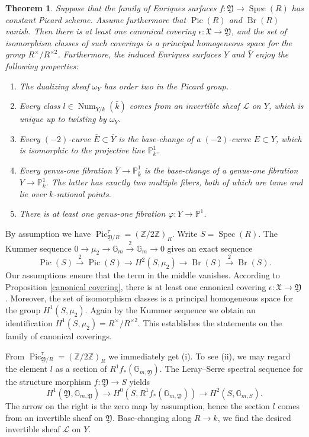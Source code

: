 \documentclass[oneside, 12pt]{amsart}
\newcommand\mylabel[1]{\label{#1}\marginpar{\vspace{-1ex}\medskip\medskip\footnotesize \tt #1}}
\renewcommand\mylabel[1]{\label{#1}}
\newtheorem{theorem}{Theorem}[section]
\theoremstyle{definition}
\theoremstyle{remark}
\newcommand{\ZZ}{\mathbb{Z}}
\newcommand{\PP}{\mathbb{P}}
\newcommand{\GG}{\mathbb{G}}
\newcommand{\shL}{\mathscr{L}}
\newcommand{\foX}{\mathfrak{X}}
\newcommand{\foY}{\mathfrak{Y}}
\newcommand{\Br}{\operatorname{Br}}
\newcommand{\lra}{\longrightarrow}
\newcommand{\Num}{\operatorname{Num}}
\newcommand{\Pic}{\operatorname{Pic}}
\newcommand{\ra}{\rightarrow}
\newcommand{\Spec}{\operatorname{Spec}}
\newcommand{\bk}{{\bar{k}}}
\newcommand{\bY}{{\bar{Y}}}
\newcommand{\bE}{{\bar{E}}}
\begin{document}
\begin{theorem}
\mylabel{family with constant pic}
Suppose that the family of Enriques surfaces  $f:\foY\ra\Spec(R)$ has constant Picard scheme.
Assume furthermore  that  $\Pic(R)$  and  $\Br(R)$ vanish.
Then there is at least one canonical covering $\epsilon:\foX\ra \foY$, and 
the set of isomorphism classes  of such coverings  
is a principal homogeneous space for the  group
$R^\times/R^{\times 2}$. Furthermore, the induced Enriques surfaces $Y$ and $\bY$ enjoy the following properties:
\begin{enumerate}
\item 
The dualizing sheaf $\omega_Y$   has order two in the Picard group.
\item 
Every class $l\in \Num_{Y/k}(\bk)$ comes from an invertible sheaf $\shL$ on $Y$,
which is unique up to twisting by $\omega_Y$.
\item 
Every $(-2)$-curve $\bE\subset\bY$ is the base-change of a $(-2)$-curve $E\subset Y$, which is isomorphic  
to the projective line $\PP^1_k$.
\item 
Every genus-one fibration $ \bY\ra\PP^1_{\bk}$ is the base-change of a genus-one fibration
$ Y\ra\PP^1_k$. The latter has exactly two multiple fibers, both of which are tame and lie over   $k$-rational points.
\item 
There is at least one genus-one fibration $\varphi:Y\ra\PP^1$.
\end{enumerate}
\end{theorem}

\proof
By assumption we have $\Pic^\tau_{\foY/R}=(\ZZ/2\ZZ)_R$. 
Write $S=\Spec(R)$. The Kummer sequence $0\ra \mu_2\ra\GG_m\stackrel{2}\ra\GG_m\ra 0$ gives an exact sequence
$$
\Pic(S)\stackrel{2}{\lra}\Pic(S)\lra H^2(S,\mu_{2})\lra \Br(S)\stackrel{2}{\lra}\Br(S).
$$
Our assumptions ensure that the term in the middle vanishes.
According to Proposition \ref{canonical covering},   there is at least one canonical covering $\epsilon:\foX\ra\foY$.
Moreover, the set of isomorphism classes is a principal homogeneous space for the group $H^1(S,\mu_2)$.
Again by the Kummer sequence we obtain an identification $H^1(S,\mu_2)=R^\times/R^{\times 2}$.
This establishes the statements on the family of canonical coverings.

From $\Pic^\tau_{\foY/R}=(\ZZ/2\ZZ)_R$ we immediately get (i).
To see (ii), we may regard the element $l$ as a section of $R^1f_*(\GG_{m,\foY})$.
The Leray--Serre spectral sequence for the structure morphism $f:\foY\ra S$ yields
$$
H^1(\foY,\GG_{m,\foY})\lra H^0(S, R^1f_*(\GG_{m,\foY}))\lra H^2(S,\GG_{m,S}).
$$
The arrow on the right is the zero map  by assumption, hence the section $l$ comes from an invertible sheaf on $\foY$.
Base-changing along $R\ra k$, we find the desired invertible sheaf $\shL$ on $Y$.
\end{document}
